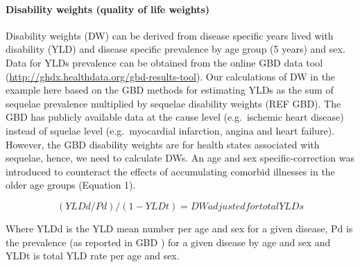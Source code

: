 \documentclass[]{article}
\let\oldparagraph\paragraph
\renewcommand{\paragraph}[1]{\oldparagraph{#1}\mbox{}}
\begin{document}
\paragraph{Disability weights (quality of life
weights)}\label{disability-weights-quality-of-life-weights}

Disability weights (DW) can be derived from disease specific years lived
with disability (YLD) and disease specific prevalence by age group (5
years) and sex. Data for YLDs prevalence can be obtained from the online
GBD data tool (\url{http://ghdx.healthdata.org/gbd-results-tool}). Our
calculations of DW in the example here based on the GBD methods for
estimating YLDs as the sum of sequelae prevalence multiplied by sequelae
disability weights (REF GBD). The GBD has publicly available data at the
cause level (e.g.~ischemic heart disease) instead of squelae level
(e.g.~myocardial infarction, angina and heart failure). However, the GBD
disability weights are for health states associated with sequelae,
hence, we need to calculate DWs. An age and sex specific-correction was
introduced to counteract the effects of accumulating comorbid illnesses
in the older age groups (Equation 1).

\begin{equation}
\label{DW adjusted for total YLDs-YLDdPd1YLDt}
(YLDd/Pd)/(1-YLDt) = DW adjusted for total YLDs
\end{equation}

Where YLDd is the YLD mean number per age and sex for a given disease,
Pd is the prevalence (as reported in GBD ) for a given disease by age
and sex and YLDt is total YLD rate per age and sex.

\end{document}
